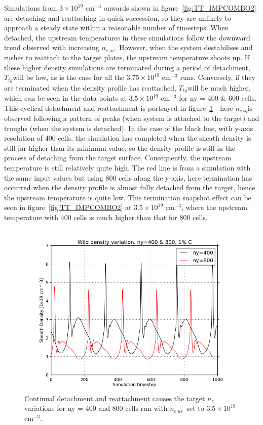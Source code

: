 \documentclass[11pt, twocolumn]{article}  %
\providecommand{\noNe}[1]{{${#1}\times 10^{19}$ cm$^{-3}$}} %
\providecommand{\neus}{$n_{e~us}$} %
\providecommand{\netg}{$n_{e~tg}$} %
\providecommand{\Tus}{$T_{tg}$} %
\begin{document}
Simulations from \noNe{3} onwards shown in figure~\ref{fig:TT_IMPCOMBO2} are detaching and reattaching in quick succession, so they are unlikely to approach a steady state within a reasonable number of timesteps. When detached, the upstream temperatures in these simulations follow the downward trend observed with increasing \neus. However, when the system destabilises and rushes to reattach to the target plates, the upstream temperature shoots up. If these higher density simulations are terminated during a period of detachment, \Tus will be low, as is the case for all the \noNe{3.75} runs. Conversely, if they are terminated when the density profile has reattached, \Tus will be much higher, which can be seen in the data points at \noNe{3.5} for ny = 400 \& 600 cells. This cyclical detachment and reattachment is portrayed in figure~\ref{fig:ny400800r35netg} - here \netg is observed following a pattern of peaks (when system is attached to the target) and troughs (when the system is detached). In the case of the black line, with y-axis resolution of 400 cells, the simulation has completed when the sheath density is still far higher than its minimum value, so the density profile is still in the process of detaching from the target surface. Consequently, the upstream temperature is still relatively quite high. The red line is from a simulation with the same input values but using 800 cells along the y-axis, here termination has occurred when the density profile is almost fully detached from the target, hence the upstream temperature is quite low. This termination snapshot effect can be seen in figure~\ref{fig:TT_IMPCOMBO2} at \noNe{3.5}, where the upstream temperature with 400 cells is much higher than that for 800 cells.

\begin{figure}
\includegraphics[scale=0.5]{Figures/sol1d/ny400800r35netg.png}
\centering
\caption{Continual detachment and reattachment causes the target $n_e$ variations for ny = 400 and 800 cells run with \neus~set to \noNe{3.5}.}\label{fig:ny400800r35netg}
\end{figure}
\end{document}
